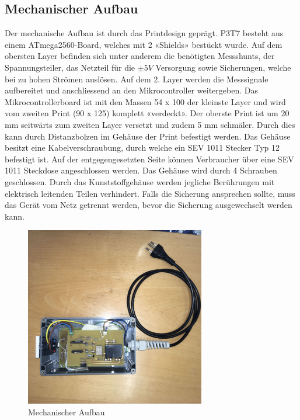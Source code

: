 \subsection{Mechanischer Aufbau}
Der mechanische Aufbau ist durch das Printdesign geprägt. P3T7 besteht aus einem ATmega2560-Board, welches mit 2 «Shields» bestückt wurde. Auf dem obersten Layer befinden sich unter anderem die benötigten Messshunts, der Spannungsteiler, das Netzteil für die $\pm 5V$ Versorgung sowie Sicherungen, welche bei zu hohen Strömen auslösen. Auf dem 2. Layer werden die Messsignale aufbereitet und anschliessend an den Mikrocontroller weitergeben. Das Mikrocontrollerboard ist mit den Massen 54 x 100 der kleinste Layer und wird vom zweiten Print (90 x 125) komplett «verdeckt». Der oberste Print ist um 20 mm seitwärts zum zweiten Layer versetzt und zudem 5 mm schmäler. Durch dies kann durch Distanzbolzen im Gehäuse der Print befestigt werden. Das Gehäuse besitzt eine Kabelverschraubung, durch welche ein SEV 1011 Stecker Typ 12 befestigt ist. Auf der entgegengesetzten Seite können Verbraucher über eine SEV 1011 Steckdose angeschlossen werden.
Das Gehäuse wird durch 4 Schrauben geschlossen. Durch das Kunststoffgehäuse werden jegliche Berührungen mit elektrisch leitenden Teilen verhindert. Falls die Sicherung ansprechen sollte, muss das Gerät vom Netz getrennt werden, bevor die Sicherung ausgewechselt werden kann. 


\begin{figure}[H]
\begin{center}
\includegraphics[width=0.7\textwidth ]{images/Konzept_MechAuf.jpeg}
\caption{Mechanischer Aufbau}
\label{fig:Mechanischer_Aufbau}
\end{center}
\end{figure}

